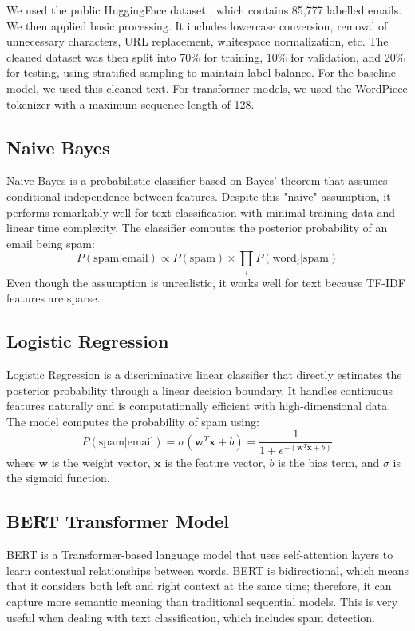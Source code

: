 \documentclass{article}
\begin{document}
We used the public HuggingFace dataset \cite{huggingface_dataset}, which contains 85,777 labelled emails. We then applied basic processing. It includes lowercase conversion, removal of unnecessary characters, URL replacement, whitespace normalization, etc. The cleaned dataset was then split into 70\% for training, 10\% for validation, and 20\% for testing, using stratified sampling to maintain label balance. For the baseline model, we used this cleaned text. For transformer models, we used the WordPiece tokenizer with a maximum sequence length of 128. 


\subsection{Naive Bayes}
Naive Bayes is a probabilistic classifier based on Bayes' theorem that assumes conditional independence between features. Despite this "naive" assumption, it performs remarkably well for text classification with minimal training data and linear time complexity. The classifier computes the posterior probability of an email being spam:
\[
P(\text{spam}|\text{email}) \propto P(\text{spam}) \times \prod_{i} P(\text{word}_i|\text{spam})
\]
Even though the assumption is unrealistic, it works well for text because TF-IDF features are sparse.

\subsection{Logistic Regression}
Logistic Regression is a discriminative linear classifier that directly estimates the posterior probability through a linear decision boundary. It handles continuous features naturally and is computationally efficient with high-dimensional data. The model computes the probability of spam using:
\[
P(\text{spam}|\text{email}) = \sigma(\mathbf{w}^T\mathbf{x} + b) = \frac{1}{1 + e^{-(\mathbf{w}^T\mathbf{x} + b)}}
\]
where $\mathbf{w}$ is the weight vector, $\mathbf{x}$ is the feature vector, $b$ is the bias term, and $\sigma$ is the sigmoid function.



\subsection{BERT Transformer Model}
BERT is a Transformer-based language model that uses self-attention layers to learn contextual relationships between words. BERT is bidirectional, which means that it considers both left and right context at the same time; therefore, it can capture more semantic meaning than traditional sequential models. This is very useful when dealing with text classification, which includes spam detection.
\end{document}
